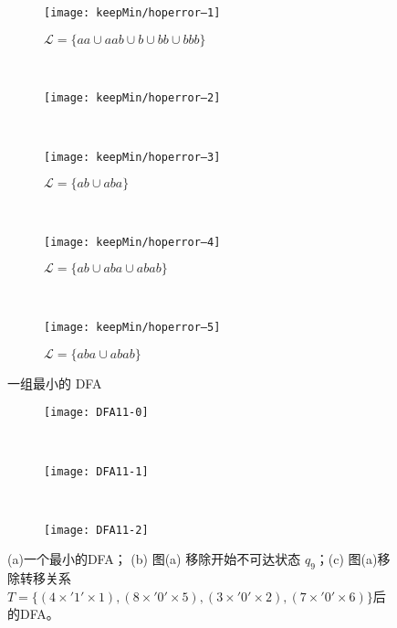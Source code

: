 \begin{figure}[!htbp]
    \centering
    \begin{subfigure}[b]{0.49\textwidth}
        \texttt{[image: keepMin/hoperror--1]}
        \caption{$\mathcal{L}=\{aa \cup aab \cup b \cup bb \cup bbb\}$}
        \label{fig:hoperror--1}
    \end{subfigure}
    ~
    \begin{subfigure}[b]{0.49\textwidth}
        \texttt{[image: keepMin/hoperror--2]}
        \caption{}
        \label{fig:hoperror--2}
    \end{subfigure}
    \\
    \begin{subfigure}[b]{0.7\textwidth}
        \texttt{[image: keepMin/hoperror--3]}
        \caption{$\mathcal{L}=\{ab \cup aba\}$}
        \label{fig:hoperror--3}
    \end{subfigure}
    ~
    \begin{subfigure}[b]{0.7\textwidth}
        \texttt{[image: keepMin/hoperror--4]}
        \caption{$\mathcal{L}=\{ab \cup aba \cup abab\}$}
        \label{fig:hoperror--4}
    \end{subfigure}
    ~
    \begin{subfigure}[b]{0.7\textwidth}
        \texttt{[image: keepMin/hoperror--5]}
        \caption{$\mathcal{L}=\{aba \cup abab\}$}
        \label{fig:hoperror--5}
    \end{subfigure}
    \caption{一组最小的 DFA }
    \label{fig:hopcerror}
  \end{figure}

\begin{figure}[!htbp]
    \centering
    \begin{subfigure}[b]{0.9\textwidth}
        \texttt{[image: DFA11-0]}
        \caption{}
        \label{fig:DFA11-0}
    \end{subfigure}
    \\
    \begin{subfigure}[b]{0.9\textwidth}
        \texttt{[image: DFA11-1]}
        \caption{}
        \label{fig:DFA11-1}
    \end{subfigure}
    \\
    \begin{subfigure}[b]{0.9\textwidth}
        \texttt{[image: DFA11-2]}
        \caption{}
        \label{fig:DFA11-2}
    \end{subfigure}
    \caption{(a)一个最小的DFA；  (b) 图(a) 移除开始不可达状态 {$q_9$}；(c) 图(a)移除转移关系$T=\{(4 \times '1' \times 1),(8 \times '0' \times 5),(3 \times '0' \times 2),(7 \times '0' \times 6)\}$后的DFA。 }
    \label{fig:DFA11}
  \end{figure}